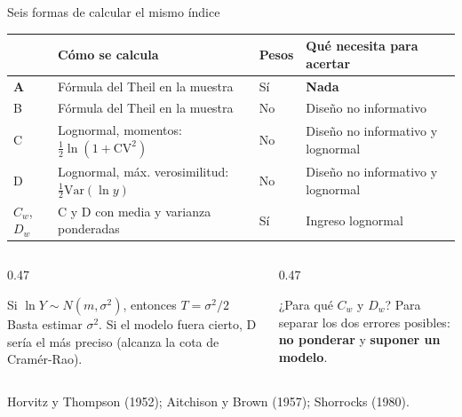 \documentclass[aspectratio=169,11pt]{beamer}
\begin{document}
\begin{frame}{Seis formas de calcular el mismo índice}
  \centering
  \footnotesize
  \renewcommand{\arraystretch}{1.3}
  \begin{tabular}{@{}llll@{}}
    \toprule
    & Cómo se calcula & Pesos & Qué necesita para acertar \\
    \midrule
    \textbf{A} & Fórmula del Theil en la muestra & Sí & \textbf{Nada} \\
    B & Fórmula del Theil en la muestra & No & Diseño no informativo \\
    C & Lognormal, momentos: $\tfrac12\ln(1+\mathrm{CV}^2)$ & No & Diseño no informativo y lognormal \\
    D & Lognormal, máx. verosimilitud: $\tfrac12\mathrm{Var}(\ln y)$ & No & Diseño no informativo y lognormal \\
    $C_w$, $D_w$ & C y D con media y varianza ponderadas & Sí & Ingreso lognormal \\
    \bottomrule
  \end{tabular}

  \vspace{0.45cm}
  \begin{columns}[T]
    \begin{column}{0.47\textwidth}
      \begin{block}{Si $\ln Y\sim N(m,\sigma^2)$, entonces $T=\sigma^2/2$}
        \footnotesize Basta estimar $\sigma^2$. Si el modelo fuera cierto, D sería el más preciso (alcanza la cota de Cramér-Rao).
      \end{block}
    \end{column}
    \begin{column}{0.47\textwidth}
      \begin{block}{¿Para qué $C_w$ y $D_w$?}
        \footnotesize Para separar los dos errores posibles: \textbf{no ponderar} y \textbf{suponer un modelo}.
      \end{block}
    \end{column}
  \end{columns}

  \vspace{0.2cm}
  {\tiny\color{gray} Horvitz y Thompson (1952); Aitchison y Brown (1957); Shorrocks (1980).}
\end{frame}
\end{document}
